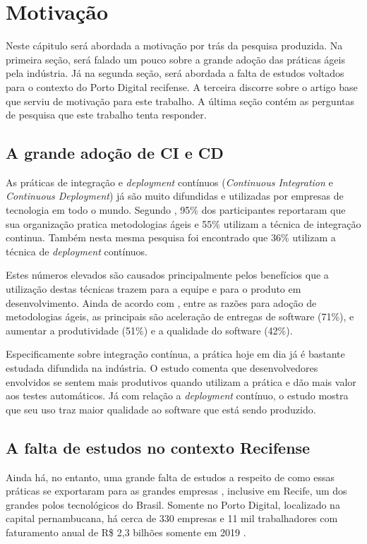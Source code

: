 
\chapter{Motivação}
Neste cápitulo será abordada a motivação por trás da pesquisa produzida. Na primeira seção, será falado um pouco sobre a grande adoção das práticas ágeis pela indústria. Já na segunda seção, será abordada a falta de estudos voltados para o contexto do Porto Digital recifense. A terceira discorre sobre o artigo base que serviu de motivação para este trabalho. A última seção contém as perguntas de pesquisa que este trabalho tenta responder.

\section{A grande adoção de CI e CD}
As práticas de integração e \emph{deployment} contínuos (\emph{Continuous Integration} e \emph{Continuous Deployment}) já são muito difundidas e utilizadas por empresas de tecnologia em todo o mundo. Segundo \cite{stateAgileReport2020}, 95\% dos participantes reportaram que sua organização pratica metodologias ágeis e 55\% utilizam a técnica de integração continua. Também nesta mesma pesquisa foi encontrado que 36\% utilizam a técnica de \emph{deployment} contínuos. 

Estes números elevados são causados principalmente pelos benefícios que a utilização destas técnicas trazem para a equipe e para o produto em desenvolvimento. Ainda de acordo com \cite{stateAgileReport2020}, entre as razões para adoção de metodologias ágeis, as principais são aceleração de entregas de software (71\%), e aumentar a produtividade (51\%) e a qualidade do software (42\%). 

Especificamente sobre integração contínua, a prática hoje em dia já é bastante estudada difundida na indústria. O estudo \cite{hilton2016} comenta que desenvolvedores envolvidos se sentem mais produtivos quando utilizam a prática e dão mais valor aos testes automáticos.  Já com relação a \emph{deployment} contínuo, o estudo \cite{savor2015} mostra que seu uso traz maior qualidade ao software que está sendo produzido. 

\section{A falta de estudos no contexto Recifense}

Ainda há, no entanto, uma grande falta de estudos a respeito de como essas práticas se exportaram para as grandes empresas \cite{empiricalStudy2016}, inclusive em Recife, um dos grandes polos tecnológicos do Brasil. Somente no Porto Digital, localizado na capital pernambucana, há cerca de 330 empresas e 11 mil trabalhadores com faturamento anual de R\$ 2,3 bilhões somente em 2019 \cite{portoDigital}.

